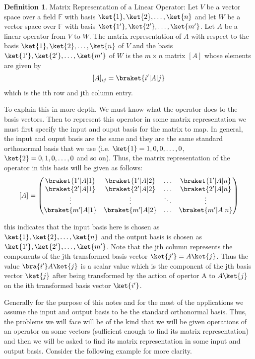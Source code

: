 \documentclass[12pt, oneside]{book}
\theoremstyle{definition}
\newtheorem{definition}{Definition}[section]
\theoremstyle{definition}
\theoremstyle{remark}
\begin{document}
\begin{definition}
    Matrix Representation of a Linear Operator: Let $V$ be a vector space over a field 
    $\mathbb{F}$ with basis $\ket{1},\ket{2},\ldots,\ket{n}$ and let $W$ be a vector 
    space over $\mathbb{F}$ with basis $\ket{1'},\ket{2'},\ldots,\ket{m'}$. Let $A$ be 
    a linear operator from $V$ to $W$. The matrix representation of $A$ with respect to 
    the basis $\ket{1},\ket{2},\ldots,\ket{n}$ of $V$ and the basis $\ket{1'},\ket{2'},
    \ldots,\ket{m'}$ of $W$ is the $m\times n$ matrix $[A]$ whose elements are given by
    \[[A]_{ij}=\braket{i'|A|j}\]
    which is the ith row and jth column entry.
\end{definition}

To explain this in more depth. We must know what the operator does to the basis vectors. Then
to represent this operator in some matrix representation we must first specify the input and ouput basis
for the matrix to map. In general, the input and ouput basis are the same and they are the same standard orthonormal
basis that we use (i.e. $\ket{1}=1,0,0,\ldots,0$, $\ket{2}=0,1,0,\ldots,0$ and so on). 
Thus, the matrix representation of the operator in this basis will be given as follows:
\[ [A]=\begin{pmatrix} \braket{1'|A|1} & \braket{1'|A|2} & \ldots & \braket{1'|A|n} \\ \braket{2'|A|1} & \braket{2'|A|2} & \ldots & \braket{2'|A|n} \\ \vdots & \vdots & \ddots & \vdots \\ \braket{m'|A|1} & \braket{m'|A|2} & \ldots & \braket{m'|A|n} \end{pmatrix} \]

this indicates that the input basis here is chosen as $\ket{1},\ket{2},\ldots,\ket{n}$ and the output basis is chosen as $\ket{1'},\ket{2'},\ldots,\ket{m'}$.
Note that the jth column represents the components of the jth transformed basis vector $\ket{j'}=A\ket{j}$. 
Thus the value $\bra{i'}A\ket{j}$ is a scalar value which is the component of the jth basis vector $\ket{j}$ after being transformed by the action of opertor 
A to $A\ket{j}$ on the ith transformed basis vector $\ket{i'}$.

Generally for the purpose of this notes and for the most of the applications we assume the input and output basis to 
be the standard orthonormal basis. Thus, the problems we will face will be of the kind that we will be given operations of 
an operator on some vectors (sufficient enough to find its matrix representation) and then 
we will be asked to find its matrix representation in some input and output basis. Consider the following example for more
clarity.
\end{document}
